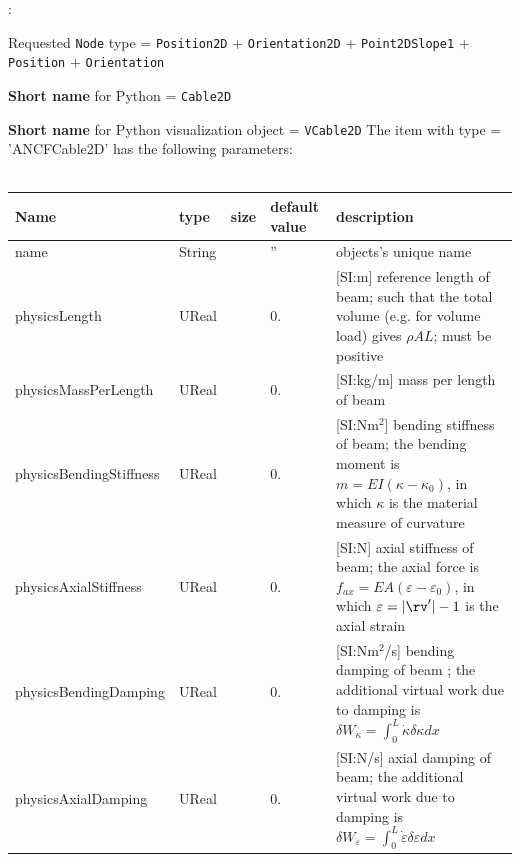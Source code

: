 \noindent {}:
\bi
  \item Requested \texttt{Node} type = \texttt{Position2D} + \texttt{Orientation2D} + \texttt{Point2DSlope1} + \texttt{Position} + \texttt{Orientation}
  \item {\bf Short name} for Python = \texttt{Cable2D}
  \item {\bf Short name} for Python visualization object = \texttt{VCable2D}
\ei\vspace{12pt} \noindent 
The item  with type = 'ANCFCable2D' has the following parameters:
\vspace{-0.5cm}\\
\vspace{-0.5cm}\\
\begin{center}
  \footnotesize
  \begin{longtable}{| p{4.5cm} | p{2.5cm} | p{0.5cm} | p{2.5cm} | p{6cm} |}
    \hline
    \bf Name & \bf type & \bf size & \bf default value & \bf description \\ \hline
    name &     String &      &     '' &     objects's unique name\\ \hline
    physicsLength &     UReal &      &     0. &      [SI:m] reference length of beam; such that the total volume (e.g. for volume load) gives $\rho A L$; must be positive\\ \hline
    physicsMassPerLength &     UReal &      &     0. &      [SI:kg/m] mass per length of beam\\ \hline
    physicsBendingStiffness &     UReal &      &     0. &      [SI:Nm$^2$] bending stiffness of beam; the bending moment is $m = EI (\kappa - \kappa_0)$, in which $\kappa$ is the material measure of curvature\\ \hline
    physicsAxialStiffness &     UReal &      &     0. &      [SI:N] axial stiffness of beam; the axial force is $f_{ax} = EA (\varepsilon -\varepsilon_0)$, in which $\varepsilon = |\rv^\prime|-1$ is the axial strain\\ \hline
    physicsBendingDamping &     UReal &      &     0. &      [SI:Nm$^2$/s] bending damping of beam ; the additional virtual work due to damping is $\delta W_{\dot \kappa} = \int_0^L \dot \kappa \delta \kappa dx$\\ \hline
    physicsAxialDamping &     UReal &      &     0. &      [SI:N/s] axial damping of beam; the additional virtual work due to damping is $\delta W_{\dot\varepsilon} = \int_0^L \dot \varepsilon \delta \varepsilon dx$\\ \hline

\end{longtable}
\end{center}
